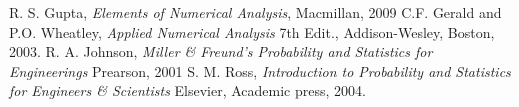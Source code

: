 \begin{thebibliography}{}
\let\clearpage\relax
 R. S. Gupta, \emph{Elements of Numerical Analysis}, Macmillan, 2009
 C.F. Gerald and P.O. Wheatley, \emph {Applied Numerical Analysis} 7th Edit., Addison-Wesley, Boston, 2003.
 R. A. Johnson, \emph{Miller \& Freund's Probability and Statistics for Engineerings} Prearson, 2001
 S. M. Ross, \emph{Introduction to Probability and Statistics for Engineers \& Scientists} Elsevier, Academic press, 2004.

\end{thebibliography}














